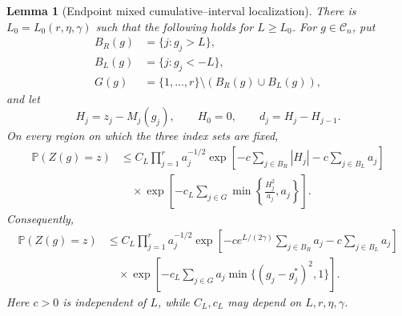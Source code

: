 \documentclass[11pt]{article}
\newtheorem{lemma}[theorem]{Lemma}
\theoremstyle{remark}
\newcommand{\Pp}{\mathbb P}
\begin{document}
\begin{lemma}[Endpoint mixed cumulative--interval localization]
\label{lem:endpoint-mixed-localization}
There is \(L_0=L_0(r,\eta,\gamma)\) such that the following holds for
\(L\ge L_0\).  For \(g\in\mathscr C_n\), put
\[
\begin{aligned}
        B_R(g)&=\{j:g_j>L\},\\
        B_L(g)&=\{j:g_j<-L\},\\
        G(g)&=\{1,\ldots,r\}\setminus(B_R(g)\cup B_L(g)),
\end{aligned}
\]
and let
\[
        H_j=z_j-M_j(g_j),\qquad H_0=0,
        \qquad d_j=H_j-H_{j-1}.
\]
On every region on which the three index sets are fixed,
\[
\begin{aligned}
\Pp(Z(g)=z)
&\le C_L\prod_{j=1}^ra_j^{-1/2}
\exp\left[-c\sum_{j\in B_R}|H_j|
           -c\sum_{j\in B_L}a_j\right]\\
&\quad\times
\exp\left[-c_L\sum_{j\in G}
\min\left\{\frac{H_j^2}{a_j},a_j\right\}\right].
\end{aligned}
\tag{8.16}\label{eq:endpoint-mixed-cumulative-bound}
\]
Consequently,
\[
\begin{aligned}
\Pp(Z(g)=z)
&\le C_L\prod_{j=1}^ra_j^{-1/2}
\exp\left[-ce^{L/(2\gamma)}\sum_{j\in B_R}a_j
           -c\sum_{j\in B_L}a_j\right]\\
&\quad\times
\exp\left[-c_L\sum_{j\in G}
 a_j\min\{(g_j-g_j^*)^2,1\}\right].
\end{aligned}
\tag{8.17}\label{eq:endpoint-mixed-scaled-bound}
\]
Here \(c>0\) is independent of \(L\), while \(C_L,c_L\) may depend on
\(L,r,\eta,\gamma\).
\end{lemma}
\end{document}
